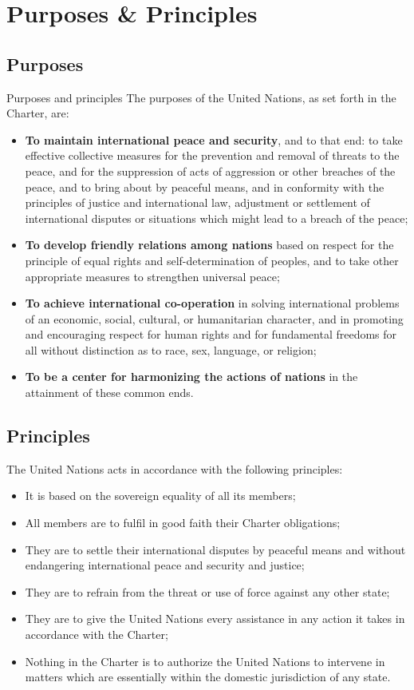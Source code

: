 \section{Purposes \& Principles}
\subsection{Purposes}
Purposes and principles
The purposes of the United Nations, as set forth in the Charter, are:
\begin{itemize}
	\item \textbf{To maintain international peace and security}, and to that end: to take effective collective measures for the prevention and removal of threats to the peace, and for the suppression of acts of aggression or other breaches of the peace, and to bring about by peaceful means, and in conformity with the principles of justice and international law, adjustment or settlement of international disputes or situations which might lead to a breach of the peace;
	\item \textbf{To develop friendly relations among nations} based on respect for the principle of equal rights and self-determination of peoples, and to take other appropriate measures to strengthen universal peace;
	\item \textbf{To achieve international co-operation} in solving international problems of an economic, social, cultural, or humanitarian character, and in promoting and encouraging respect for human rights and for fundamental freedoms for all without distinction as to race, sex, language, or religion;
	\item \textbf{To be a center for harmonizing the actions of nations} in the attainment of these common ends.
\end{itemize}
\subsection{Principles}
The United Nations acts in accordance with the following principles:
\begin{itemize}
	\item It is based on the sovereign equality of all its members;
	\item All members are to fulfil in good faith their Charter obligations;
	\item They are to settle their international disputes by peaceful means and without endangering international peace and security and justice;
	\item They are to refrain from the threat or use of force against any other state;
	\item They are to give the United Nations every assistance in any action it takes in accordance with the Charter;
	\item Nothing in the Charter is to authorize the United Nations to intervene in mat­ters which are essentially within the domestic jurisdiction of any state.
\end{itemize}